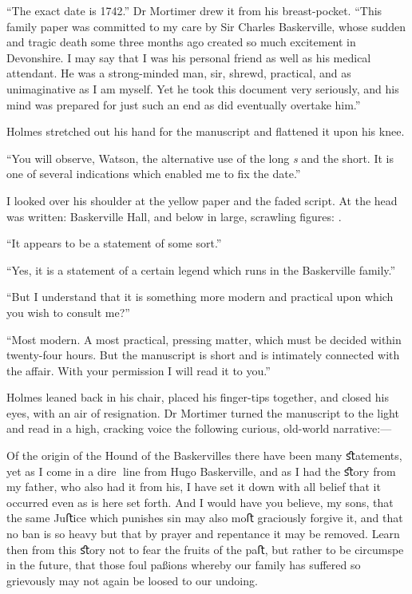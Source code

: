 \documentclass[paper=5.5in:8.5in,BCOR=7mm,twoside,DIV=calc,12pt,usegeometry,openany,chapterprefix,endperiod,headings=big]{scrbook} %
\begin{document}
\enquote{The exact date is 1742.} Dr Mortimer drew it from his breast-pocket. \enquote{This family paper was committed to my care by Sir Charles Baskerville, whose sudden and tragic death some three months ago created so much excitement in Devonshire. I may say that I was his personal friend as well as his medical attendant. He was a strong-minded man, sir, shrewd, practical, and as unimaginative as I am myself. Yet he took this document very seriously, and his mind was prepared for just such an end as did eventually overtake him.}

Holmes stretched out his hand for the manuscript and flattened it upon his knee.

\enquote{You will observe, Watson, the alternative use of the long \textit{s} and the short. It is one of several indications which enabled me to fix the date.}

I looked over his shoulder at the yellow paper and the faded script. At the head was written: \oldfont Baskerville Hall\normalfont, and below in large, scrawling figures: . \normalfont

\enquote{It appears to be a statement of some sort.}

\enquote{Yes, it is a statement of a certain legend which runs in the Baskerville family.}

\enquote{But I understand that it is something more modern and practical upon which you wish to consult me?}

\enquote{Most modern. A most practical, pressing matter, which must be decided within twenty-four hours. But the manuscript is short and is intimately connected with the affair. With your permission I will read it to you.}

Holmes leaned back in his chair, placed his finger-tips together, and closed his eyes, with an air of resignation. Dr Mortimer turned the manuscript to the light and read in a high, cracking voice the following curious, old-world narrative:--- \\

\vfill

\oldfont
Of the origin of the Hound of the Baskervilles there have been many ﬆatements, yet as I come in a dire line from Hugo Baskerville, and as I had the ﬆory from my father, who also had it from his, I have set it down with all belief that it occurred even as is here set forth. And I would have you believe, my sons, that the same Juﬅice which punishes sin may also moﬅ graciously forgive it, and that no ban is so heavy but that by prayer and repentance it may be removed. Learn then from this ﬆory not to fear the fruits of the paﬅ, but rather to be circumspe in the future, that those foul paßions whereby our family has suﬀered so grievously may not again be loosed to our undoing.
\end{document}
